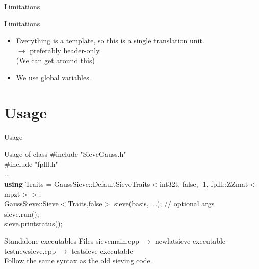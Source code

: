 \documentclass{beamer}
\begin{document}
\begin{frame}{Limitations}
\begin{block}{Limitations}
\begin{itemize}
 \item Everything is a template, so this is a single translation unit.\\
 $\longrightarrow$ preferably header-only.\\
 (We can get around this)
 \item We use global variables.
\end{itemize}
\end{block}
\end{frame}

\section{Usage}

\begin{frame}{Usage}
\begin{block}{Usage of class}
 $\#$include "SieveGauss.h"\\
 $\#$include "fplll.h"\\
 ...\\
 \textbf{using} Traits = GaussSieve::DefaultSieveTraits$<$int32\textunderscore t, false, -1, fplll::ZZ\textunderscore  mat$<$mpz\textunderscore t$>>$;\\
 GaussSieve::Sieve$<$Traits,false$>$ sieve(basis, ...); // optional args\\
 sieve.run();\\
 sieve.print\textunderscore status();
\end{block}
\begin{block}{Standalone executables}
Files sieve\textunderscore main.cpp $\rightarrow$ newlatsieve executable\\
test\textunderscore newsieve.cpp $\rightarrow$ testsieve executable\\
Follow the same syntax as the old sieving code.
\end{block}
\end{frame}
\end{document}
